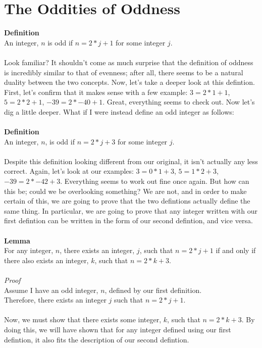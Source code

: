 \documentclass[a4paper,12pt]{article}
\begin{document}
\section{The Oddities of Oddness}
\textbf{Definition}\\
An integer, $n$ is odd if $n = 2*j + 1$ for some integer $j$.\\
\\
Look familiar? It shouldn't come as much surprise that the definition of oddness is incredibly similar to that of evenness; after all, there seems to be a natural duality between the two concepts. Now, let's take a deeper look at this defintion. First, let's confirm that it makes sense with a few example: $3 = 2*1 + 1$, $5 = 2*2 + 1$, $-39 = 2*-40 + 1$. Great, everything seems to check out. Now let's dig a little deeper. What if I were instead define an odd integer as follows:\\
\\
\textbf{Definition}\\
An integer, $n$, is odd if $n = 2*j + 3$ for some integer $j$.\\
\\
Despite this definition looking different from our original, it isn't actually any less correct. Again, let's look at our examples: $3 = 0*1 + 3$, $5 = 1*2 + 3$, $-39 = 2*-42 + 3$. Everything seems to work out fine once again. But how can this be; could we be overlooking something? We are not, and in order to make certain of this, we are going to prove that the two defintions actually define the same thing. In particular, we are going to prove that any integer written with our first defintion can be written in the form of our second defintion, and vice versa.\\
\\
\textbf{Lemma}\\
For any integer, $n$, there exists an integer, $j$, such that $n = 2*j + 1$ if and only if there also exists an integer, $k$, such that $n = 2*k + 3$.\\
\\ 
\textit{Proof}\\
Assume I have an odd integer, $n$, defined by our first definition.\\
Therefore, there exists an integer $j$ such that $n = 2*j + 1$.\\
\\
Now, we must show that there exists some integer, $k$, such that $n = 2*k + 3$. By doing this, we will have shown that for any integer defined using our first defintion, it also fits the description of our second defintion.\\
\end{document}
